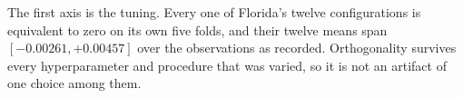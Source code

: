 The first axis is the tuning. Every one of Florida's twelve configurations is equivalent to zero on
its own five folds, and their twelve means span $[-0.00261, +0.00457]$ over the observations as
recorded. Orthogonality survives every hyperparameter and procedure that was varied, so it is not an
artifact of one choice among them.

